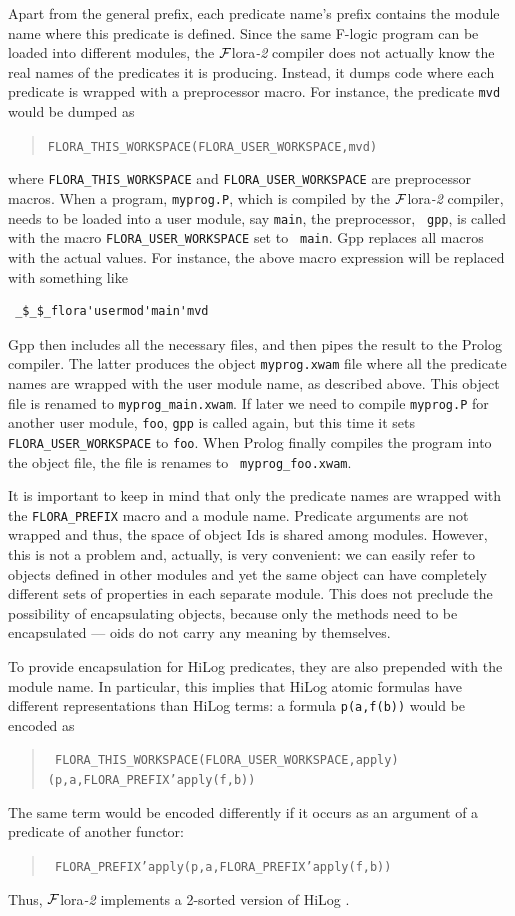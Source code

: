 \documentclass[11pt]{article}
\newcommand{\FLSYSTEM}{{\mbox{\sc ${\cal F}${lora}\rm\emph{-2}}}\xspace}
\newcommand{\fl}{\mbox{F-logic}\xspace}
\newcommand{\ofile}{xwam}
\begin{document}
Apart from the general prefix, each predicate name's prefix contains the module
name where this predicate is defined. Since the same \fl program
can be loaded into different modules, the \FLSYSTEM compiler does not actually
know the real names of the predicates it is producing. Instead, it dumps
code where each predicate is wrapped with a preprocessor macro. For
instance, the predicate {\tt mvd} would be dumped as
\begin{quote}
 \tt FLORA\_THIS\_WORKSPACE(FLORA\_USER\_WORKSPACE,mvd)  
\end{quote}
where {\tt FLORA\_THIS\_WORKSPACE} and {\tt FLORA\_USER\_WORKSPACE} are
preprocessor macros. 
When a program, {\tt myprog.P}, which is compiled by the \FLSYSTEM compiler,
needs to be loaded into a user module, say {\tt main}, the preprocessor, {\tt
  gpp}, is called with the macro {\tt FLORA\_USER\_WORKSPACE} set to {\tt
  main}. Gpp replaces all macros with the actual values.
For instance, the above macro expression will be replaced with something like
\begin{verbatim}
 _$_$_flora'usermod'main'mvd  
\end{verbatim}
Gpp then includes all the
necessary files, and then pipes the result to the Prolog compiler. The latter
produces the object {\tt myprog.\ofile} file where all the predicate names are
wrapped with the user module name, as described above.  This object file is
renamed to {\tt myprog\_main.\ofile}. If later we need to compile {\tt myprog.P}
for another user module, {\tt foo}, {\tt gpp} is called again, but this time it
sets {\tt FLORA\_USER\_WORKSPACE} to {\tt foo}. When Prolog finally compiles
the program into the object file, the file is renames to {\tt
  myprog\_foo.\ofile}.

It is important to keep in mind that only the predicate names are wrapped
with the {\tt FLORA\_PREFIX} macro and a module name. Predicate arguments
are not wrapped and thus, the space of object Ids is shared among modules.
However, this is not a problem and, actually, is very convenient: we can
easily refer to objects defined in other modules and yet the same object
can have completely different sets of properties in each separate module.
This does not preclude the possibility of encapsulating objects, because
only the methods need to be encapsulated --- oids do not carry any meaning
by themselves.

To provide encapsulation for HiLog predicates, they are also prepended with
the module name. In particular, this implies that HiLog atomic formulas
have different representations than HiLog terms: a formula {\tt p(a,f(b))}
would be encoded as
\begin{quote}
 \tt
 FLORA\_THIS\_WORKSPACE(FLORA\_USER\_WORKSPACE,apply)(p,a,FLORA\_PREFIX'apply(f,b))  
\end{quote}
The same term would be encoded differently if it occurs as an argument of a
predicate of another functor:
\begin{quote}
 \tt
 FLORA\_PREFIX'apply(p,a,FLORA\_PREFIX'apply(f,b))    
\end{quote}
Thus, \FLSYSTEM implements a 2-sorted version of HiLog \cite{hilog-icdt-95}.
\end{document}
